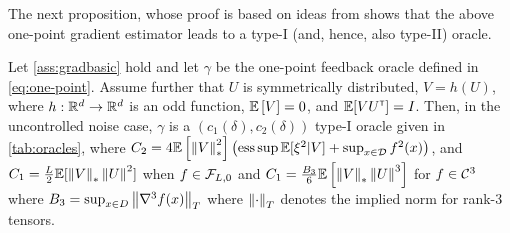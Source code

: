 The next proposition, whose proof is based on ideas from \citet{spall1992multivariate}
 shows that the above one-point gradient estimator leads to a type-I (and, hence, also type-II) oracle.
\begin{proposition}
\label{prop:grad-onepoint}
Let \cref{ass:gradbasic} hold and let $\gamma$ be the one-point feedback oracle defined in \eqref{eq:one-point}.
Assume further that
  $U$ is symmetrically distributed,
  $V = h(U)$, where $h:\mathbb{R}^d \to \mathbb{R}^d$ is an odd function,
  $\mathbb{E}\left[V\right]=0$, and $\mathbb{E}[V U^\mathsf{\scriptscriptstyle T}] = I$.
Then, in the uncontrolled noise case, $\gamma$ is a $(c_1(\delta),c_2(\delta))$ type-I oracle given in \cref{tab:oracles}, where 
$C_2=4 \mathbb{E}\left[\left\|V\right\|_*^2\right]\left( \operatorname{ess\,sup} \mathbb{E}[\xi^2|V]+\sup_{x\in\mathcal{D}} f^2(x)\right)$, and $C_1 =
\frac{L}{2} \mathbb{E}[ \left\|V\right\|_* \left\|U\right\|^2]$ when $f \in \mathcal{F}_{L,0}$ and  
$C_1 = \tfrac{B_3}{6} \mathbb{E}\left[ \left\|V\right\|_* \left\|U\right\|^3 \right]$ for  $f \in \mathcal{C}^3$ where $B_3 = \sup_{x\in D} \left\| \nabla^3 f(x) \right\|_T$ where $\left\|\cdot\right\|_T$ denotes the implied norm for rank-3 tensors.%
\end{proposition}

